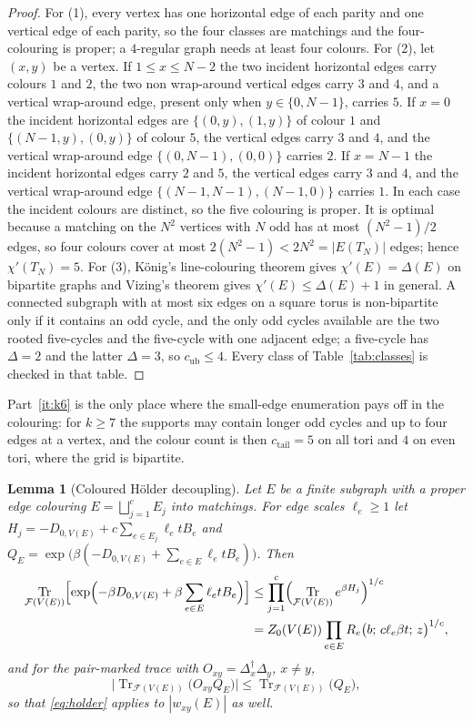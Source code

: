 \documentclass[11pt]{article}
\theoremstyle{plain}
\newtheorem{lemma}{Lemma}
\theoremstyle{definition}
\DeclareMathOperator{\Tr}{Tr}
\newcommand{\Dop}{\Delta}
\begin{document}
\begin{proof}
For (1), every vertex has one horizontal edge of each parity and one vertical edge of
each parity, so the four classes are matchings and the four-colouring is proper; a
$4$-regular graph needs at least four colours. For (2), let $(x,y)$ be a vertex. If
$1\le x\le N-2$ the two incident horizontal edges carry colours $1$ and $2$, the two
non wrap-around vertical edges carry $3$ and $4$, and a vertical wrap-around edge,
present only when $y\in\{0,N-1\}$, carries $5$. If $x=0$ the incident horizontal
edges are $\{(0,y),(1,y)\}$ of colour $1$ and $\{(N-1,y),(0,y)\}$ of colour $5$, the
vertical edges carry $3$ and $4$, and the vertical wrap-around edge
$\{(0,N-1),(0,0)\}$ carries $2$. If $x=N-1$ the incident horizontal edges carry $2$
and $5$, the vertical edges carry $3$ and $4$, and the vertical wrap-around edge
$\{(N-1,N-1),(N-1,0)\}$ carries $1$. In each case the incident colours are distinct,
so the five colouring is proper. It is optimal because a matching on the
$N^{2}$ vertices with $N$ odd has at most $(N^{2}-1)/2$ edges, so four colours cover
at most $2(N^{2}-1)<2N^{2}=|E(T_N)|$ edges; hence $\chi'(T_N)=5$. For (3), K\"onig's
line-colouring theorem gives $\chi'(E)=\Delta(E)$ on bipartite graphs and Vizing's
theorem gives $\chi'(E)\le\Delta(E)+1$ in general. A connected subgraph with at most
six edges on a square torus is non-bipartite only if it contains an odd cycle, and the
only odd cycles available are the two rooted five-cycles and the five-cycle with one
adjacent edge; a five-cycle has $\Delta=2$ and the latter $\Delta=3$, so
$c_{\mathrm{ub}}\le4$. Every class of Table~\ref{tab:classes} is checked in that
table.
\end{proof}

Part~\ref{it:k6} is the only place where the small-edge enumeration pays off in the
colouring: for $k\ge7$ the supports may contain longer odd cycles and up to four
edges at a vertex, and the colour count is then $c_{\mathrm{tail}}=5$ on all tori and
$4$ on even tori, where the grid is bipartite.

\begin{lemma}[Coloured H\"older decoupling]\label{lem:holder}
Let $E$ be a finite subgraph with a proper edge colouring
$E=\bigsqcup_{j=1}^{c}E_j$ into matchings. For edge scales $\ell_e\ge1$ let
$H_j=-D_{0,V(E)}+c\sum_{e\in E_j}\ell_etB_e$ and
$Q_E=\exp\bigl(\beta(-D_{0,V(E)}+\sum_{e\in E}\ell_etB_e)\bigr)$. Then
\begin{equation}\label{eq:holder}
\begin{aligned}
\Tr_{\mathcal{F}(V(E))}\Bigl[\exp\Bigl(-\beta D_{0,V(E)}
+\beta\sum_{e\in E}\ell_etB_e\Bigr)\Bigr]
&\le\prod_{j=1}^{c}\Bigl(\Tr_{\mathcal{F}(V(E))}e^{\beta H_j}\Bigr)^{1/c}\\
&=Z_0(V(E))\prod_{e\in E}R_e\bigl(b;\,c\ell_e\beta t;\,z\bigr)^{1/c},
\end{aligned}
\end{equation}
and for the pair-marked trace with $O_{xy}=\Dop_x^\dagger\Dop_y$, $x\ne y$,
\[
\bigl|\Tr_{\mathcal{F}(V(E))}\bigl(O_{xy}Q_E\bigr)\bigr|
\le\Tr_{\mathcal{F}(V(E))}\bigl(Q_E\bigr),
\]
so that \eqref{eq:holder} applies to $|w_{xy}(E)|$ as well.
\end{lemma}
\end{document}
